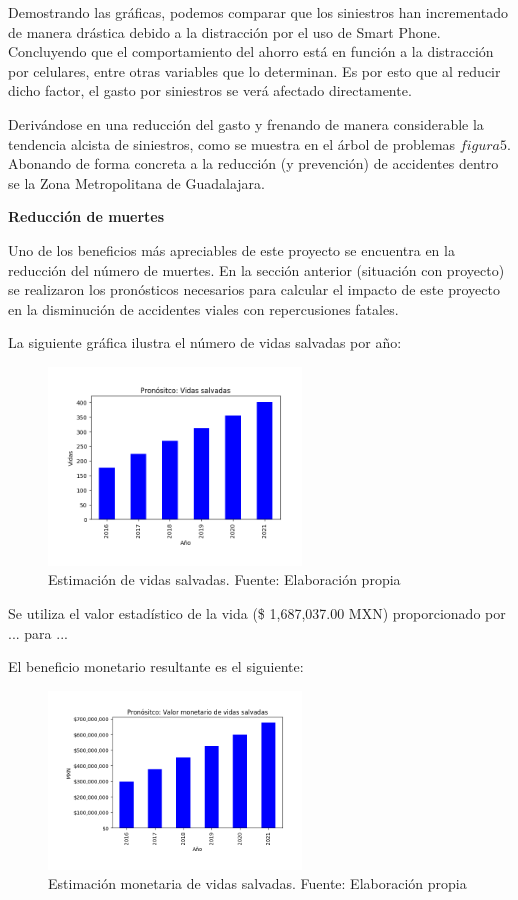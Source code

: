 \documentclass{article}
\begin{document}
Demostrando las gráficas, podemos comparar que los siniestros han incrementado de manera drástica debido a la distracción por el uso de Smart Phone. Concluyendo que el comportamiento del ahorro está en función a la distracción por celulares, entre otras variables que lo determinan. Es por esto que al reducir dicho factor, el gasto por siniestros se verá afectado directamente. 
 
Derivándose en una reducción del gasto y frenando de manera considerable la tendencia alcista de siniestros, como se muestra en el árbol de problemas $figura 5$. Abonando de forma concreta a la reducción (y prevención) de accidentes dentro se la Zona Metropolitana de Guadalajara. 

\textbf{Reducción de muertes}

Uno de los beneficios más apreciables de este proyecto se encuentra en la reducción del número de muertes. En la 
sección anterior (situación con proyecto) se realizaron los pronósticos necesarios para calcular el impacto 
de este proyecto en la disminución de accidentes viales con repercusiones fatales. 

La siguiente gráfica ilustra el número de vidas salvadas por año: 

	\begin{figure}[H]\centering
	\includegraphics[width=0.6\textwidth]{resources/img/saved_lifes.png}
	\caption{\label{fig:vidas_salvadas} Estimación de vidas salvadas. Fuente: Elaboración propia}
    \end{figure}


Se utiliza el valor estadístico de la vida (\$ 1,687,037.00 MXN) proporcionado por ... para ...

El beneficio monetario resultante es el siguiente:


	\begin{figure}[H]\centering
	\includegraphics[width=0.6\textwidth]{resources/img/saved_lifes_money.png}
	\caption{\label{fig:vidas_salvadas_dinero} Estimación monetaria de vidas salvadas. Fuente: Elaboración propia}
    \end{figure}
\end{document}
